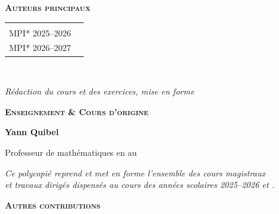 \begin{center}
\begin{minipage}{0.85\textwidth}
    {\large\bfseries\color{vorange!95!black}\scshape Auteurs principaux\par}
    \vspace{0.45em}
    \begin{tabular*}{\linewidth}{@{\extracolsep{\fill}}cc@{}}
      \begin{minipage}[t]{0.45\linewidth}
        \raggedleft
        {\Large\bfseries L. Dehmas}\\[0.2em]
        {\footnotesize\scshape MPI* 2025--2026}
      \end{minipage}
      &
      \begin{minipage}[t]{0.45\linewidth}
        {\Large\bfseries C. Perry}\\[0.2em]
        {\footnotesize\scshape MPI* 2026--2027}
      \end{minipage}
    \end{tabular*}
    \\[0.5em]
    {\small\itshape Rédaction du cours et des exercices, mise en forme\par}

    \vspace{0.75cm}

    \makeatletter%
    {\large\bfseries\color{vorange!95!black}\scshape Enseignement \& Cours d'origine\par}
    \vspace{0.3em}
    {\Large\bfseries Yann Quibel\par}
    \vspace{0.2em}
    {\small Professeur de mathématiques en \@filiere{} au \@etablissement\par}
    \vspace{0.3em}
    {\small\itshape Ce polycopié reprend et met en forme l'ensemble des cours magistraux\\%
    et travaux dirigés dispensés au cours des années scolaires 2025--2026 et \@annee.\par}
    \makeatother%
    
    \vspace{0.75cm}

    {\large\bfseries\color{vorange!95!black}\scshape Autres contributions\par}
    \vspace{0.5em}

    \newcommand{\csep}{\hspace{0.5em}\tikz[baseline=-0.6ex]{\fill[vorange!80] (0,0) ++(0,1.5pt) -- ++(1.5pt,-1.5pt) -- ++(-1.5pt,-1.5pt) -- ++(-1.5pt,1.5pt) -- cycle;}\hspace{0.5em}}


\end{minipage}
\end{center}
